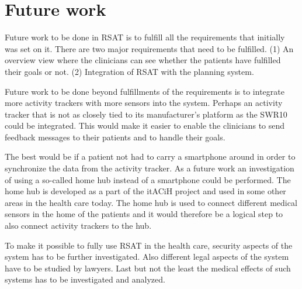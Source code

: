 \documentclass{cslthse-msc}
\begin{document}

\section{Future work}

Future work to be done in RSAT is to fulfill all the requirements that initially was set on it. There are two major requirements that need to be fulfilled. (1) An overview view where the clinicians can see whether the patients have fulfilled their goals or not. (2) Integration of RSAT with the planning system. 

Future work to be done beyond fulfillments  of the requirements is to integrate more activity trackers with more sensors into the system.  Perhaps an activity tracker that is not as closely tied to its manufacturer’s platform as the SWR10 could be integrated. This would make it easier to enable the clinicians to send feedback messages to their patients and to handle their goals. 

The best would be if a patient not had to carry a smartphone around in order to synchronize the data from the activity tracker. As a future work an investigation of using a so-called home hub instead of a smartphone could be performed. The home hub is developed as a part of the itACiH project and used in some other areas in the health care today. The home hub is  used to connect different medical sensors in the home of the patients and it would therefore be a logical step to also connect activity trackers to the hub. 

To make it possible to fully use RSAT in the health care, security aspects of the system has to be further investigated. Also different legal aspects of the system have to be studied by lawyers. Last but not the least the medical effects of such systems has to be investigated and analyzed. 

 

\end{document}
